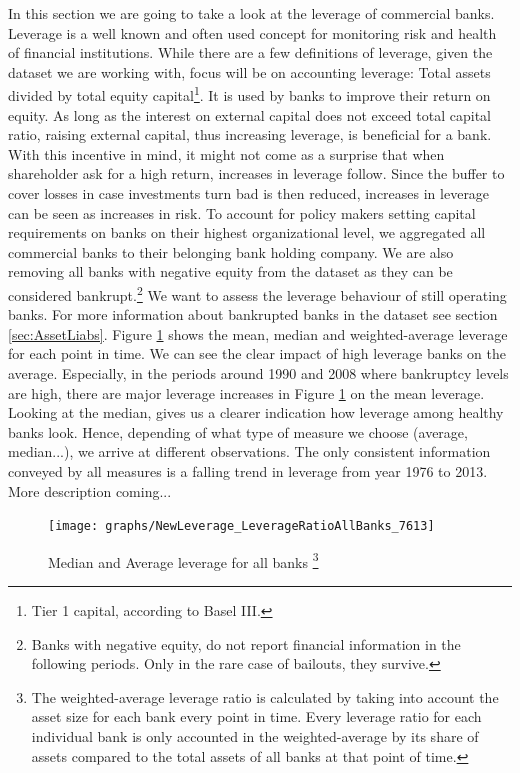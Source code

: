 \documentclass[12pt, a4paper]{article} %
\begin{document}
In this section we are going to take a look at the leverage of commercial banks. Leverage is a well known and often used concept for monitoring risk and health of financial institutions. While there are a few definitions of leverage, given the dataset we are working with, focus will be on accounting leverage: Total assets divided by total equity capital\footnote{Tier 1 capital, according to Basel III.}. It is used by banks to improve their return on equity. As long as the interest on external capital does not exceed total capital ratio, raising external capital, thus increasing leverage, is beneficial for a bank. With this incentive in mind, it might not come as a surprise that when shareholder ask for a high return, increases in leverage follow. Since the buffer to cover losses in case investments turn bad is then reduced, increases in leverage can be seen as increases in risk. To account for policy makers setting capital requirements on banks on their highest organizational level, we aggregated all commercial banks to their belonging bank holding company. 
We are also removing all banks with negative equity from the dataset as they can be considered bankrupt.\footnote{Banks with negative equity, do not report financial information in the following periods. Only in the rare case of bailouts, they survive.} We want to assess the leverage behaviour of still operating banks. For more information about bankrupted banks in the dataset see section \ref{sec:AssetLiabs}.
Figure \ref{fig:averageLeverage} shows the mean, median and weighted-average leverage for each point in time. We can see the clear impact of high leverage banks on the average. Especially, in the periods around 1990 and 2008 where bankruptcy levels are high, there are major leverage increases in Figure \ref{fig:averageLeverage} on the mean leverage. Looking at the median, gives us a clearer indication how leverage among healthy banks look. Hence, depending of what type of measure we choose (average, median...), we arrive at different observations. The only consistent information conveyed by all measures is a falling trend in leverage from year 1976 to 2013.  More description coming...


\begin{figure}[hbtp]
\begin{minipage}{\textwidth}
\centering
\caption[1]{Median and Average leverage for all banks \footnote{The weighted-average leverage ratio is calculated by taking into account the asset size for each bank every point in time. Every leverage ratio for each individual bank is only accounted in the weighted-average by its share of assets compared to the total assets of all banks at that point of time.}}
\texttt{[image: graphs/NewLeverage\_LeverageRatioAllBanks\_7613]}
\label{fig:averageLeverage}
\end{minipage}
\end{figure}
\end{document}
